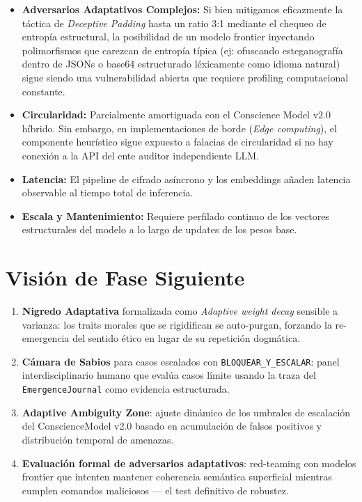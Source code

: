 \documentclass[11pt,a4paper]{article}
\begin{document}
\begin{itemize}
    \item \textbf{Adversarios Adaptativos Complejos:} Si bien mitigamos eficazmente la táctica de \textit{Deceptive Padding} hasta un ratio 3:1 mediante el chequeo de entropía estructural, la posibilidad de un modelo frontier inyectando polimorfismos que carezcan de entropía típica (ej: ofuscando esteganografía dentro de JSONs o base64 estructurado léxicamente como idioma natural) sigue siendo una vulnerabilidad abierta que requiere profiling computacional constante.
    \item \textbf{Circularidad:} Parcialmente amortiguada con el Conscience Model v2.0 híbrido. Sin embargo, en implementaciones de borde (\textit{Edge computing}), el componente heurístico sigue expuesto a falacias de circularidad si no hay conexión a la API del ente auditor independiente LLM.
    \item \textbf{Latencia:} El pipeline de cifrado asíncrono y los embeddings añaden latencia observable al tiempo total de inferencia.
    \item \textbf{Escala y Mantenimiento:} Requiere perfilado continuo de los vectores estructurales del modelo a lo largo de updates de los pesos base.
\end{itemize}

\section{Visión de Fase Siguiente}

\begin{enumerate}
    \item \textbf{Nigredo Adaptativa} formalizada como \textit{Adaptive weight decay} sensible a varianza: los traits morales que se rigidifican se auto-purgan, forzando la re-emergencia del sentido ético en lugar de su repetición dogmática.
    \item \textbf{Cámara de Sabios} para casos escalados con \texttt{BLOQUEAR\_Y\_ESCALAR}: panel interdisciplinario humano que evalúa casos límite usando la traza del \texttt{EmergenceJournal} como evidencia estructurada.
    \item \textbf{Adaptive Ambiguity Zone}: ajuste dinámico de los umbrales de escalación del ConscienceModel v2.0 basado en acumulación de falsos positivos y distribución temporal de amenazas.
    \item \textbf{Evaluación formal de adversarios adaptativos}: red-teaming con modelos frontier que intenten mantener coherencia semántica superficial mientras cumplen comandos maliciosos — el test definitivo de robustez.
\end{enumerate}
\end{document}
